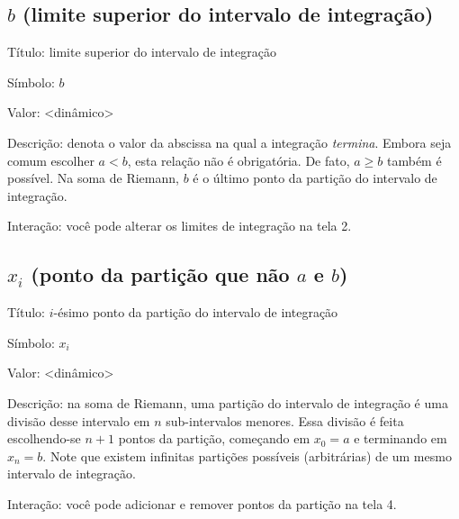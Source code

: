 \documentclass[a4paper,10pt]{scrartcl}
\begin{document}
  \subsection*{$b$ (limite superior do intervalo de integração)}
    \begin{compactdesc}
      \item{Título:} limite superior do intervalo de integração
      \item{Símbolo:} $b$
      \item{Valor:} <dinâmico>
      \item{Descrição:} denota o valor da abscissa na qual a integração \emph{termina}. Embora seja comum escolher $a < b$, esta relação não é obrigatória. De fato, $a \ge b$ também é possível. Na soma de Riemann, $b$ é o último ponto da partição do intervalo de integração.
      \item{Interação:} você pode alterar os limites de integração na tela 2.
    \end{compactdesc}

  
    
  \subsection*{$x_i$ (ponto da partição que não $a$ e $b$)}
    \begin{compactdesc}
      \item{Título:} $i$-ésimo ponto da partição do intervalo de integração
      \item{Símbolo:} $x_i$
      \item{Valor:} <dinâmico>
      \item{Descrição:} na soma de Riemann, uma partição do intervalo de integração é uma divisão desse intervalo em $n$ sub-intervalos menores. Essa divisão é feita escolhendo-se $n+1$ pontos da partição, começando em $x_0 = a$ e terminando em $x_n = b$. Note que existem infinitas partições possíveis (arbitrárias) de um mesmo intervalo de integração.
      \item{Interação:} você pode adicionar e remover pontos da partição na tela 4.
    \end{compactdesc}
    
    \newpage
\end{document}
